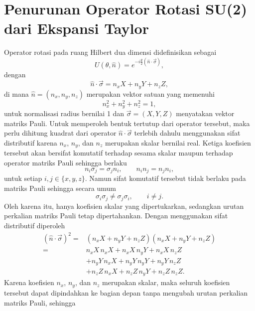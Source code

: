\chapter{Penurunan Operator Rotasi SU(2) dari Ekspansi Taylor}
\label{app:su2_taylor}

Operator rotasi pada ruang Hilbert dua dimensi didefinisikan sebagai
\begin{equation}
U(\theta,\hat{n})
=
e^{-i\frac{\theta}{2}(\hat{n}\cdot\vec{\sigma})},
\end{equation}
dengan
\begin{equation}
    \label{eq:ndef}
\hat{n}\cdot\vec{\sigma}
=
n_xX+n_yY+n_zZ,
\end{equation}
di mana $\hat{n}=(n_x,n_y,n_z)$ merupakan vektor satuan yang memenuhi
\begin{equation}
n_x^2+n_y^2+n_z^2=1,
\end{equation}
untuk normalisasi radius bernilai 1 dan $\vec{\sigma}=(X,Y,Z)$ menyatakan vektor matriks Pauli. Untuk memperoleh bentuk tertutup dari operator tersebut, maka perlu dihitung kuadrat dari operator $\hat{n}\cdot\vec{\sigma}$ terlebih dahulu menggunakan sifat distributif karena $n_x$, $n_y$, dan $n_z$ merupakan skalar bernilai real. Ketiga koefisien tersebut akan bersifat komutatif terhadap sesama skalar maupun terhadap operator matriks Pauli sehingga berlaku
\begin{equation}
n_i\sigma_j=\sigma_jn_i,
\qquad
n_in_j=n_jn_i,
\end{equation}
untuk setiap $i,j\in\{x,y,z\}$. Namun sifat komutatif tersebut tidak berlaku pada matriks Pauli sehingga secara umum
\begin{equation}
\sigma_i\sigma_j\neq\sigma_j\sigma_i,
\qquad i\neq j.
\end{equation}
Oleh karena itu, hanya koefisien skalar yang dipertukarkan, sedangkan urutan perkalian matriks Pauli tetap dipertahankan. Dengan menggunakan sifat distributif diperoleh
\begin{equation}
\begin{aligned}
(\hat n\cdot\vec\sigma)^2
={}&
(n_xX+n_yY+n_zZ)
(n_xX+n_yY+n_zZ)\\
={}&
n_xX\,n_xX
+n_xX\,n_yY
+n_xX\,n_zZ\\
&
+n_yY\,n_xX
+n_yY\,n_yY
+n_yY\,n_zZ\\
&
+n_zZ\,n_xX
+n_zZ\,n_yY
+n_zZ\,n_zZ.
\end{aligned}
\end{equation}
Karena koefisien $n_x$, $n_y$, dan $n_z$ merupakan skalar, maka seluruh koefisien tersebut dapat dipindahkan ke bagian depan tanpa mengubah urutan perkalian matriks Pauli, sehingga
